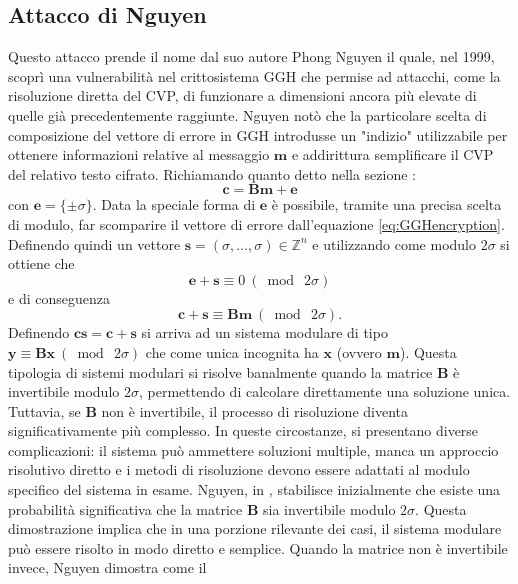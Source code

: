 \subsection{Attacco di Nguyen}
\label{sec:Nguyen}
Questo attacco prende il nome dal suo autore Phong Nguyen\cite{Nguyen99} il quale, nel 1999, scoprì una 
vulnerabilità nel crittosistema GGH che permise ad attacchi, come la risoluzione diretta del 
CVP, di funzionare a dimensioni ancora più elevate di quelle già precedentemente raggiunte. 
Nguyen notò che la particolare scelta di composizione del vettore di errore in GGH introdusse
un "indizio" utilizzabile per ottenere informazioni relative al messaggio $\mathbf{m}$
e addirittura semplificare il CVP del relativo testo cifrato. Richiamando quanto detto
nella sezione :
\begin{equation}
    \label{eq:GGHencryption}
    \mathbf{c} = \mathbf{B}\mathbf{m} + \mathbf{e}
\end{equation}
con $\mathbf{e} = \{\pm \sigma\}$. Data la speciale forma di $\mathbf{e}$ è possibile, tramite una precisa scelta di modulo,
far scomparire il vettore di errore dall'equazione \ref{eq:GGHencryption}. Definendo
quindi un vettore $\mathbf{s} = (\sigma,\dots,\sigma) \in \mathbb{Z}^n$ e utilizzando come
modulo $2\sigma$ si ottiene che 
\[
    \mathbf{e} + \mathbf{s} \equiv 0 \ (\bmod \ 2\sigma)
\]
e di conseguenza
\[
    \mathbf{c} + \mathbf{s} \equiv \mathbf{B}\mathbf{m} \ (\bmod \ 2\sigma).
\]
Definendo $\mathbf{cs} = \mathbf{c} + \mathbf{s}$ si arriva ad un sistema modulare di tipo
$\mathbf{y} \equiv \mathbf{B}\mathbf{x}\ (\bmod \ 2\sigma)$ che come unica incognita 
ha $\mathbf{x}$ (ovvero $\mathbf{m}$). Questa tipologia di sistemi modulari si risolve banalmente quando la matrice 
$\mathbf{B}$ è invertibile modulo $2\sigma$, permettendo di calcolare direttamente una 
soluzione unica. 
Tuttavia, se $\mathbf{B}$ non è invertibile,  il processo di risoluzione diventa significativamente 
più complesso. In queste circostanze, si presentano diverse complicazioni: il sistema può 
ammettere soluzioni multiple, manca un approccio risolutivo diretto e i metodi 
di risoluzione devono essere adattati al modulo specifico del sistema in esame. Nguyen, 
in \cite{Nguyen99}, stabilisce inizialmente che esiste una probabilità significativa
che la matrice $\mathbf{B}$ sia invertibile modulo $2\sigma$. Questa dimostrazione implica 
che in una porzione rilevante dei casi, il sistema modulare può essere risolto in modo 
diretto e semplice. Quando la matrice non è invertibile invece, Nguyen dimostra come il
